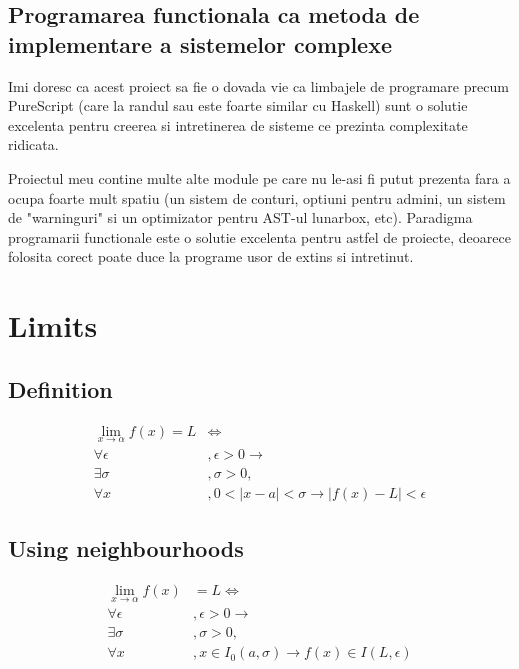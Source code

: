 \documentclass{article}
\begin{document}
\subsection{Programarea functionala ca metoda de implementare a sistemelor complexe}
\par Imi doresc ca acest proiect sa fie o dovada vie ca limbajele de programare precum PureScript (care la randul sau este foarte similar cu Haskell) sunt o solutie excelenta pentru creerea si intretinerea de sisteme ce prezinta complexitate ridicata.
\par
Proiectul meu contine multe alte module pe care nu le-asi fi putut prezenta fara a ocupa foarte mult spatiu (un sistem de conturi, optiuni pentru admini, un sistem de "warninguri" si un optimizator pentru AST-ul lunarbox, etc).
Paradigma programarii functionale este o solutie excelenta pentru astfel de proiecte, deoarece folosita corect poate duce la programe usor de extins si intretinut.

\section{Limits}
\subsection{Definition}
\par
\begin{equation*} \label{Limit definition}
	\begin{aligned}
		\lim_{x \to \alpha} f(x) = L & \iff
		\\\forall \epsilon&, \epsilon > 0 \to
		\\\exists \sigma&,  \sigma > 0,
		\\\forall x&, 0 < |x - a| < \sigma \to
		|f(x) - L| < \epsilon
	\end{aligned}
\end{equation*}
\subsection{Using neighbourhoods}
\par
\begin{equation*} \label{Limit definition using neighbourhoods}
	\begin{aligned}
		\lim_{x \to \alpha} f(x) & = L \iff
		\\\forall \epsilon &, \epsilon > 0 \to
		\\\exists \sigma &, \sigma > 0,
		\\\forall x &, x \in I_{0}(a, \sigma) \to
		f(x) \in I(L, \epsilon)
	\end{aligned}
\end{equation*}

% 
% 
\end{document}
